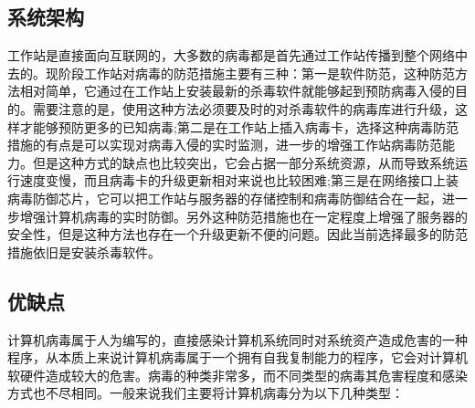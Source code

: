 			\subsection{系统架构}		
			工作站是直接面向互联网的，大多数的病毒都是首先通过工作站传播到整个网络中去的。现阶段工作站对病毒的防范措施主要有三种：第一是软件防范，这种防范方法相对简单，它通过在工作站上安装最新的杀毒软件就能够起到预防病毒入侵的目的。需要注意的是，使用这种方法必须要及时的对杀毒软件的病毒库进行升级，这样才能够预防更多的已知病毒;第二是在工作站上插入病毒卡，选择这种病毒防范措施的有点是可以实现对病毒入侵的实时监测，进一步的增强工作站病毒防范能力。但是这种方式的缺点也比较突出，它会占据一部分系统资源，从而导致系统运行速度变慢，而且病毒卡的升级更新相对来说也比较困难;第三是在网络接口上装病毒防御芯片，它可以把工作站与服务器的存储控制和病毒防御结合在一起，进一步增强计算机病毒的实时防御。另外这种防范措施也在一定程度上增强了服务器的安全性，但是这种方法也存在一个升级更新不便的问题。因此当前选择最多的防范措施依旧是安装杀毒软件。
			\subsection{优缺点}
			计算机病毒属于人为编写的，直接感染计算机系统同时对系统资产造成危害的一种程序，从本质上来说计算机病毒属于一个拥有自我复制能力的程序，它会对计算机软硬件造成较大的危害。病毒的种类非常多，而不同类型的病毒其危害程度和感染方式也不尽相同。一般来说我们主要将计算机病毒分为以下几种类型：